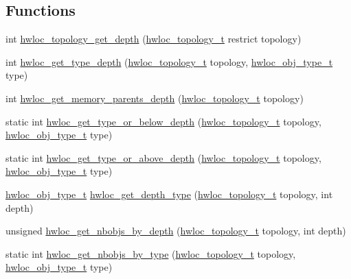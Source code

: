 \subsection*{Functions}
\begin{DoxyCompactItemize}
\item 
int \hyperlink{a00187_gae54d1782ca9b54bea915f5c18a9158fa}{hwloc\+\_\+topology\+\_\+get\+\_\+depth} (\hyperlink{a00186_ga9d1e76ee15a7dee158b786c30b6a6e38}{hwloc\+\_\+topology\+\_\+t} restrict topology)
\item 
int \hyperlink{a00187_ga8bec782e21be313750da70cf7428b374}{hwloc\+\_\+get\+\_\+type\+\_\+depth} (\hyperlink{a00186_ga9d1e76ee15a7dee158b786c30b6a6e38}{hwloc\+\_\+topology\+\_\+t} topology, \hyperlink{a00184_gacd37bb612667dc437d66bfb175a8dc55}{hwloc\+\_\+obj\+\_\+type\+\_\+t} type)
\item 
int \hyperlink{a00187_gae85786340b88e24835f8c403a1e2e54b}{hwloc\+\_\+get\+\_\+memory\+\_\+parents\+\_\+depth} (\hyperlink{a00186_ga9d1e76ee15a7dee158b786c30b6a6e38}{hwloc\+\_\+topology\+\_\+t} topology)
\item 
static int \hyperlink{a00187_ga8125328e69eba709c33ea8055c12589b}{hwloc\+\_\+get\+\_\+type\+\_\+or\+\_\+below\+\_\+depth} (\hyperlink{a00186_ga9d1e76ee15a7dee158b786c30b6a6e38}{hwloc\+\_\+topology\+\_\+t} topology, \hyperlink{a00184_gacd37bb612667dc437d66bfb175a8dc55}{hwloc\+\_\+obj\+\_\+type\+\_\+t} type)
\item 
static int \hyperlink{a00187_ga8a9ee573b7d2190272095d10712a7cca}{hwloc\+\_\+get\+\_\+type\+\_\+or\+\_\+above\+\_\+depth} (\hyperlink{a00186_ga9d1e76ee15a7dee158b786c30b6a6e38}{hwloc\+\_\+topology\+\_\+t} topology, \hyperlink{a00184_gacd37bb612667dc437d66bfb175a8dc55}{hwloc\+\_\+obj\+\_\+type\+\_\+t} type)
\item 
\hyperlink{a00184_gacd37bb612667dc437d66bfb175a8dc55}{hwloc\+\_\+obj\+\_\+type\+\_\+t} \hyperlink{a00187_ga506b0682b98aa264d53e934d2e9badb0}{hwloc\+\_\+get\+\_\+depth\+\_\+type} (\hyperlink{a00186_ga9d1e76ee15a7dee158b786c30b6a6e38}{hwloc\+\_\+topology\+\_\+t} topology, int depth)
\item 
unsigned \hyperlink{a00187_ga1d5ceafe8130fe6e8657bf0bc666ba50}{hwloc\+\_\+get\+\_\+nbobjs\+\_\+by\+\_\+depth} (\hyperlink{a00186_ga9d1e76ee15a7dee158b786c30b6a6e38}{hwloc\+\_\+topology\+\_\+t} topology, int depth)
\item 
static int \hyperlink{a00187_ga789a3f65aedff644be64a18526a03065}{hwloc\+\_\+get\+\_\+nbobjs\+\_\+by\+\_\+type} (\hyperlink{a00186_ga9d1e76ee15a7dee158b786c30b6a6e38}{hwloc\+\_\+topology\+\_\+t} topology, \hyperlink{a00184_gacd37bb612667dc437d66bfb175a8dc55}{hwloc\+\_\+obj\+\_\+type\+\_\+t} type)

\end{DoxyCompactItemize}
